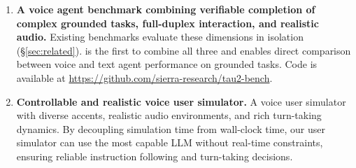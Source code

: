 \begin{enumerate}
    \item \textbf{A voice agent benchmark combining verifiable completion of complex grounded tasks, full-duplex interaction, and realistic audio.} Existing benchmarks evaluate these dimensions in isolation (\S\ref{sec:related}). \tauvoice{} is the first to combine all three and enables direct comparison between voice and text agent performance on grounded tasks. Code is available at \url{https://github.com/sierra-research/tau2-bench}.
    
    \item \textbf{Controllable and realistic voice user simulator.} A voice user simulator with diverse accents, realistic audio environments, and rich turn-taking dynamics. By decoupling simulation time from wall-clock time, our user simulator can use the most capable LLM without real-time constraints, ensuring reliable instruction following and turn-taking decisions.
    

\end{enumerate}
